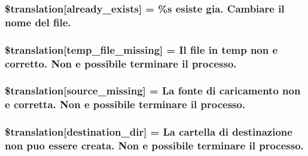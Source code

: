 \subsubsection[{\$translation}]{\setlength{\rightskip}{0pt plus 5cm}\$translation\mbox{[}\textquotesingle{}already\+\_\+exists\textquotesingle{}\mbox{]} = \textquotesingle{}\%s esiste gia. Cambiare il nome del file.\textquotesingle{}}\label{class_8upload_8it___i_t_8php_afd84e910217f04139f567c41e292afa5}
\hypertarget{class_8upload_8it___i_t_8php_ab0fa87a88aba2624004581eed0633325}{}
\subsubsection[{\$translation}]{\setlength{\rightskip}{0pt plus 5cm}\$translation\mbox{[}\textquotesingle{}temp\+\_\+file\+\_\+missing\textquotesingle{}\mbox{]} = \textquotesingle{}Il file in temp non e corretto. Non e possibile terminare il processo.\textquotesingle{}}\label{class_8upload_8it___i_t_8php_ab0fa87a88aba2624004581eed0633325}
\hypertarget{class_8upload_8it___i_t_8php_aceaaf7355acaaf10f0ae60378d03c468}{}
\subsubsection[{\$translation}]{\setlength{\rightskip}{0pt plus 5cm}\$translation\mbox{[}\textquotesingle{}source\+\_\+missing\textquotesingle{}\mbox{]} = \textquotesingle{}La fonte di caricamento non e corretta. Non e possibile terminare il processo.\textquotesingle{}}\label{class_8upload_8it___i_t_8php_aceaaf7355acaaf10f0ae60378d03c468}
\hypertarget{class_8upload_8it___i_t_8php_aff2427c72a2598aefa6d58df1dd18b08}{}
\subsubsection[{\$translation}]{\setlength{\rightskip}{0pt plus 5cm}\$translation\mbox{[}\textquotesingle{}destination\+\_\+dir\textquotesingle{}\mbox{]} = \textquotesingle{}La cartella di destinazione non puo essere creata. Non e possibile terminare il processo.\textquotesingle{}}\label{class_8upload_8it___i_t_8php_aff2427c72a2598aefa6d58df1dd18b08}
\hypertarget{class_8upload_8it___i_t_8php_a9ef28d3cf09942c6c0a1e77fa09185e8}{}

